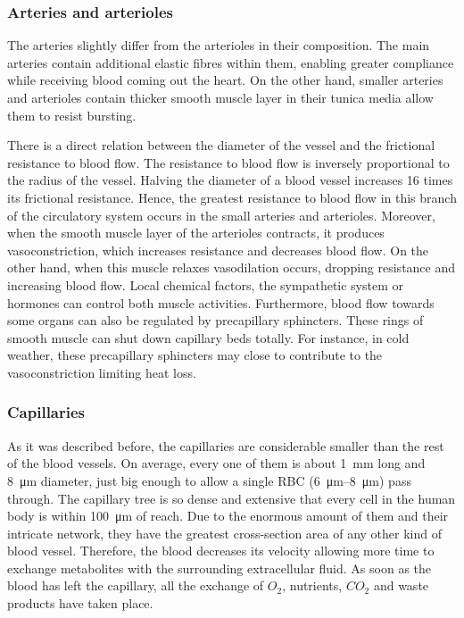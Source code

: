 \subsubsection{Arteries and arterioles}
The arteries slightly differ from the arterioles in their composition. The main arteries contain additional elastic fibres within them, enabling greater compliance while receiving blood coming out the heart. On the other hand, smaller arteries and arterioles contain thicker smooth muscle layer in their tunica media allow them to resist bursting.  

There is a direct relation between the diameter of the vessel and the frictional resistance to blood flow. The resistance to blood flow is inversely proportional to the radius of the vessel. Halving the diameter of a blood vessel increases 16 times its frictional resistance. Hence, the greatest resistance to blood flow in this branch of the circulatory system occurs in the small arteries and arterioles. Moreover, when the smooth muscle layer of the arterioles contracts, it produces vasoconstriction, which increases resistance and decreases blood flow. On the other hand, when this muscle relaxes vasodilation occurs, dropping resistance and increasing blood flow. Local chemical factors, the sympathetic system or hormones can control both muscle activities. Furthermore, blood flow towards some organs can also be regulated by precapillary sphincters. These rings of smooth muscle can shut down capillary beds totally. For instance, in cold weather, these precapillary sphincters may close to contribute to the vasoconstriction limiting heat loss.  

\subsubsection{Capillaries}
As it was described before, the capillaries are considerable smaller than the rest of the blood vessels. On average, every one of them is about \SI{1}{\milli\meter} long and \SI{8}{\micro\meter} diameter, just big enough to allow a single RBC (\SIrange{6}{8}{\micro\meter}) pass through. The capillary tree is so dense and extensive that every cell in the human body is within \SI{100}{\micro\meter} of reach.  Due to the enormous amount of them and their intricate network,  they have the greatest cross-section area of any other kind of blood vessel. Therefore, the blood decreases its velocity allowing more time to exchange metabolites with the surrounding extracellular fluid. As soon as the blood has left the capillary, all the exchange of $O_2$, nutrients, $CO_2$ and waste products have taken place. 


